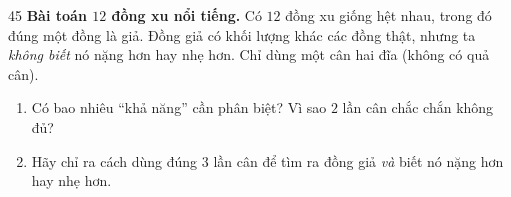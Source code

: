 \begin{probbox}{45}{}
\textbf{Bài toán $12$ đồng xu nổi tiếng.} Có $12$ đồng xu giống hệt nhau, trong đó đúng một đồng là giả. Đồng giả có khối lượng
khác các đồng thật, nhưng ta \emph{không biết} nó nặng hơn hay nhẹ hơn. Chỉ dùng một cân hai đĩa (không có quả cân).
\begin{enumerate}[label=\alph*),leftmargin=1.6em,itemsep=1pt,topsep=2pt]
  \item Có bao nhiêu ``khả năng'' cần phân biệt? Vì sao $2$ lần cân chắc chắn không đủ?
  \item Hãy chỉ ra cách dùng đúng $3$ lần cân để tìm ra đồng giả \emph{và} biết nó nặng hơn hay nhẹ hơn.
\end{enumerate}
\end{probbox}
